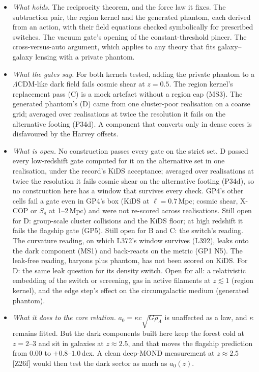 \documentclass[10pt]{article}
\begin{document}
\begin{itemize}
\item \emph{What holds.} The reciprocity theorem, and the force law it fixes. The subtraction pair, the region kernel and the generated phantom, each derived from an action, with their field equations checked symbolically for prescribed switches. The vacuum gate's opening of the constant-threshold pincer. The cross-versus-auto argument, which applies to any theory that fits galaxy--galaxy lensing with a private phantom.
\item \emph{What the gates say.} For both kernels tested, adding the private phantom to a $\Lambda$CDM-like dark field fails cosmic shear at $z=0.5$. The region kernel's replacement pass (C) is a mock artefact without a region cap (MS3). The generated phantom's (D) came from one cluster-poor realisation on a coarse grid; averaged over realisations at twice the resolution it fails on the alternative footing (P34d). A component that converts only in dense cores is disfavoured by the Harvey offsets.
\item \emph{What is open.} No construction passes every gate on the strict set. D passed every low-redshift gate computed for it on the alternative set in one realisation, under the record's KiDS acceptance; averaged over realisations at twice the resolution it fails cosmic shear on the alternative footing (P34d), so no construction here has a window that survives every check. GP4's other cells fail a gate even in GP4's box (KiDS at $\ell=0.7$\,Mpc; cosmic shear, X-COP or $S_8$ at 1--2\,Mpc) and were not re-scored across realisations. Still open for D: group-scale cluster collisions and the KiDS floor; at high redshift it fails the flagship gate (GP5). Still open for B and C: the switch's reading. The curvature reading, on which L372's window survives (L392), leaks onto the dark component (MS1) and back-reacts on the metric (GP1 N5). The leak-free reading, baryons plus phantom, has not been scored on KiDS. For D: the same leak question for its density switch. Open for all: a relativistic embedding of the switch or screening, gas in active filaments at $z\lesssim1$ (region kernel), and the edge step's effect on the circumgalactic medium (generated phantom).
\item \emph{What it does to the core relation.} $a_0=\kappa c\sqrt{G\rho_\Lambda}$ is unaffected as a law, and $\kappa$ remains fitted. But the dark components built here keep the forest cold at $z=2$--3 and sit in galaxies at $z\approx2.5$, and that moves the flagship prediction from 0.00 to $+0.8$--$1.0$\,dex. A clean deep-MOND measurement at $z\approx2.5$ [Z26f] would then test the dark sector as much as $a_0(z)$.
\end{itemize}
\end{document}
